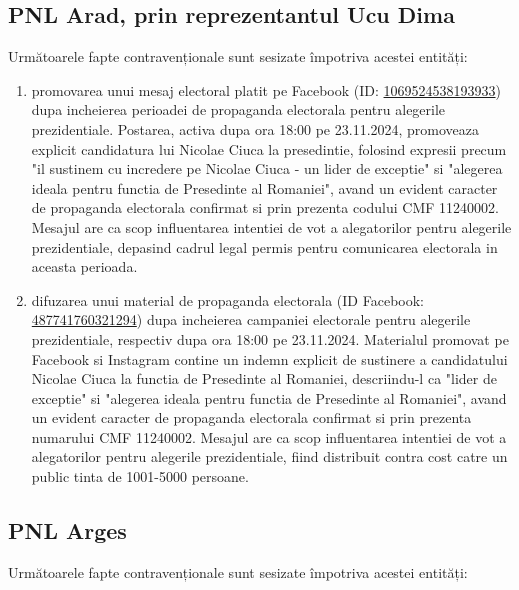 \documentclass[a4paper,12pt]{article}
\begin{document}
\vspace{0.5cm}

\subsection{PNL Arad, prin reprezentantul Ucu Dima}
Următoarele fapte contravenționale sunt sesizate împotriva acestei entități:

\begin{enumerate}[leftmargin=*, label=\arabic*.)]
    \item promovarea unui mesaj electoral platit pe Facebook (ID: \href{https://www.facebook.com/ads/library/?id=1069524538193933}{1069524538193933}) dupa incheierea perioadei de propaganda electorala pentru alegerile prezidentiale. Postarea, activa dupa ora 18:00 pe 23.11.2024, promoveaza explicit candidatura lui Nicolae Ciuca la presedintie, folosind expresii precum "il sustinem cu incredere pe Nicolae Ciuca - un lider de exceptie" si "alegerea ideala pentru functia de Presedinte al Romaniei", avand un evident caracter de propaganda electorala confirmat si prin prezenta codului CMF 11240002. Mesajul are ca scop influentarea intentiei de vot a alegatorilor pentru alegerile prezidentiale, depasind cadrul legal permis pentru comunicarea electorala in aceasta perioada.
    \item difuzarea unui material de propaganda electorala (ID Facebook: \href{https://www.facebook.com/ads/library/?id=487741760321294}{487741760321294}) dupa incheierea campaniei electorale pentru alegerile prezidentiale, respectiv dupa ora 18:00 pe 23.11.2024. Materialul promovat pe Facebook si Instagram contine un indemn explicit de sustinere a candidatului Nicolae Ciuca la functia de Presedinte al Romaniei, descriindu-l ca "lider de exceptie" si "alegerea ideala pentru functia de Presedinte al Romaniei", avand un evident caracter de propaganda electorala confirmat si prin prezenta numarului CMF 11240002. Mesajul are ca scop influentarea intentiei de vot a alegatorilor pentru alegerile prezidentiale, fiind distribuit contra cost catre un public tinta de 1001-5000 persoane.
\end{enumerate}

\vspace{0.5cm}

\subsection{PNL Arges}
Următoarele fapte contravenționale sunt sesizate împotriva acestei entități:
\end{document}
